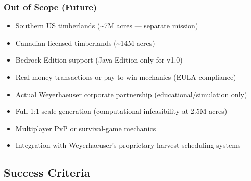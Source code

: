 \documentclass[11pt,letterpaper]{article}
\begin{document}
\subsubsection*{Out of Scope (Future)}
\begin{itemize}[nosep]
  \item Southern US timberlands (\textasciitilde7M acres --- separate mission)
  \item Canadian licensed timberlands (\textasciitilde14M acres)
  \item Bedrock Edition support (Java Edition only for v1.0)
  \item Real-money transactions or pay-to-win mechanics (EULA compliance)
  \item Actual Weyerhaeuser corporate partnership (educational/simulation only)
  \item Full 1:1 scale generation (computational infeasibility at 2.5M acres)
  \item Multiplayer PvP or survival-game mechanics
  \item Integration with Weyerhaeuser's proprietary harvest scheduling systems
\end{itemize}

\subsection{Success Criteria}
\end{document}
